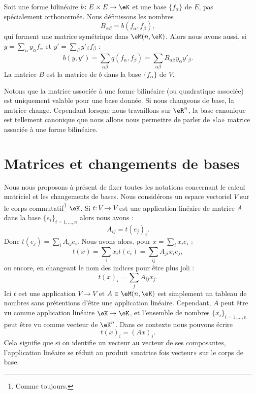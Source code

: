 Soit une forme bilinéaire \( b\colon E\times E\to \eK\) et une base \( \{ f_{\alpha} \}\) de \( E\), pas spécialement orthonormée. Nous définissons les nombres
\begin{equation}    \label{EQooCUGFooRlKUtu}
    B_{\alpha\beta}=b(f_{\alpha},f_{\beta}),
\end{equation}
qui forment une matrice symétrique dans \( \eM(n,\eK)\). Alors nous avons aussi, si \( y=\sum_{\alpha}y_{\alpha}f_{\alpha}\) et \( y'=\sum_{\beta}y'_{\beta}f_{\beta}\) :
\begin{equation}
    b(y,y')=\sum_{\alpha\beta}q(f_{\alpha},f_{\beta})=\sum_{\alpha\beta}B_{\alpha\beta}y_{\alpha}y'_{\beta}.
\end{equation}
La matrice \( B\) est la matrice de \( b\) dans la base \( \{ f_{\alpha} \}\) de \( V\).

Notons que la matrice associée à une forme bilinéaire (ou quadratique associée) est uniquement valable pour une base donnée. Si nous changeons de base, la matrice change. Cependant lorsque nous travaillons sur \( \eR^n\), la base canonique est tellement canonique que nous allons nous permettre de parler de «la» matrice associée à une forme bilinéaire.

\section{Matrices et changements de bases}

Nous nous proposons à présent de fixer toutes les notations concernant le calcul matriciel et les changements de bases. Nous considérons un espace vectoriel \( V\) sur le corps commutatif\footnote{Comme toujours.} \( \eK\). Si \( t\colon V\to V \) est une application linéaire de matrice \( A\) dans la base \( \{ e_i \}_{i=1,\ldots, n}\) alors nous avons :
\begin{equation}
    A_{ij}=t(e_j)_i.
\end{equation}
Donc \( t(e_j)=\sum_i A_{ij}e_i\). Nous avons alors, pour \( x=\sum_ix_ie_i\) :
\begin{equation}
    t(x)=\sum_ix_it(e_i)=\sum_{ij}A_{ji}x_ie_j,
\end{equation}
ou encore, en changeant le nom des indices pour être plus joli :
\begin{equation}
    t(x)_i=\sum_jA_{ij}x_j.
\end{equation}
Ici \( t\) est une application \( V\to V\) et \( A\in \eM(n,\eK)\) est simplement un tableau de nombres sans prétentions d'être une application linéaire. Cependant, \( A\) peut être vu comme application linéaire \( \eK\to \eK\), et l'ensemble de nombres \( \{ x_i \}_{i=1,\ldots, n}\) peut être vu comme vecteur de \( \eK^n\). Dans ce contexte nous pouvons écrire
\begin{equation}
    t(x)_i=(Ax)_i.
\end{equation}
Cela signifie que si on identifie un vecteur au vecteur de ses composantes, l'application linéaire se réduit au produit «matrice fois vecteur» sur le corps de base.

